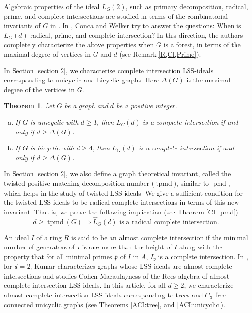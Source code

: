 \documentclass[11pt,a4paper,reqno]{amsart}
\newtheorem{thm}{Theorem}[section]
\theoremstyle{definition}
\numberwithin{equation}{section}
\DeclareMathOperator{\pmd}{pmd}
\DeclareMathOperator{\tpmd}{tpmd}
\begin{document}
Algebraic properties of the ideal $L_G(2)$, such as primary decomposition, radical, prime, and complete intersections are studied in terms of the combinatorial invariants of $G$ in \cite{CW2019, HMSW, AK2021}. 
In \cite{CW2019}, Conca and Welker try to answer the questions: When is $L_G(d)$ radical, prime, and complete intersection? In this direction, the authors completely characterize the above properties when $G$ is a forest, in terms of the maximal degree of vertices in $G$ and $d$ (see Remark \ref{R,CI,Prime}).

\vspace{2mm}

In 
Section \ref{section 2}, we characterize complete intersection LSS-ideals corresponding to unicyclic and bicyclic graphs. Here $\Delta(G)$ is the maximal degree of the vertices in $G$.
\begin{thm} \label{CI_LSS}
    Let $G$ be a graph and $d$ be a positive integer. 
    \begin{enumerate}[(a)]
        \item \label{thm1.1} If $G$ is unicyclic with $d\geq 3$, then $L_G(d)$ is a complete intersection if and only if $d \geq \Delta(G)$.
    
        \item \label{thm1.3} If $G$ is bicyclic with $d \geq 4$, then $L_{G}(d)$ is a complete intersection if and only if $d \geq \Delta(G)$.

    \end{enumerate}    
\end{thm}



In Section \ref{section 2}, we also define a graph theoretical invariant, called the twisted positive matching decomposition number ($\tpmd$), similar to $\pmd$, which helps in the study of twisted LSS-ideals. We give a sufficient condition for the twisted LSS-ideals to be radical complete intersections in terms of this new invariant. That is, we prove the following implication (see Theorem \ref{CI_pmd}).
$$ d \geq \tpmd(G) \Rightarrow \hat{L}_{G}(d) \text{ is a radical complete intersection}.$$


\vspace{2mm}





An ideal $I$ of a ring $R$ is said to be an almost complete intersection if the minimal number of generators of $I$ is one more than the height of $I$ along with the property that for all minimal primes $\mathfrak{p}$ of $I$ in $A$, $I_{\mathfrak{p}}$ is a complete intersection. In \cite{AK2021}, for $d=2$, Kumar characterizes graphs whose LSS-ideals are almost complete intersections and studies Cohen-Macaulayness of the Rees algebra of almost complete intersection LSS-ideals. 
In this article, for all $d\geq 2$, we characterize almost complete intersection LSS-ideals corresponding to trees and $C_3$-free connected unicyclic graphs (see Theorems \ref{ACI:tree}, and \ref{ACI:unicyclic}).
\end{document}
